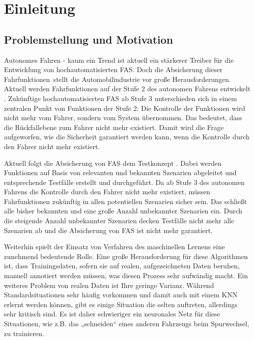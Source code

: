 
\chapter{Einleitung}
\label{einleitung}


\section{Problemstellung und Motivation}
\label{einleitung_problemstellung}

Autonomes Fahren - kaum ein Trend ist aktuell ein stärkerer Treiber für die Entwicklung von hochautomatisierten \ac{FAS}. Doch die Absicherung dieser Fahrfunktionen stellt die Automobilindustrie vor große Herausforderungen. Aktuell werden Fahrfunktionen auf der Stufe 2 des autonomen Fahrens entwickelt \cite{sae2014taxonomy}. Zukünftige hochautomatisierten \ac{FAS} ab Stufe 3 unterschieden sich in einem zentralen Punkt von Funktionen der Stufe 2: Die Kontrolle der Funktionen wird nicht mehr vom Fahrer, sondern vom System übernommen. Das bedeutet, dass die Rückfallebene zum Fahrer nicht mehr existiert. Damit wird die Frage aufgeworfen, wie die Sicherheit garantiert werden kann, wenn die Kontrolle durch den Fahrer nicht mehr existiert.

Aktuell folgt die Absicherung von \ac{FAS} dem Testkonzept \cite{schuldt2013effiziente}. Dabei werden Funktionen auf Basis von relevanten und bekannten Szenarien abgeleitet und entsprechende Testfälle erstellt und durchgeführt. Da ab Stufe 3 des autonomen Fahrens die Kontrolle durch den Fahrer nicht mehr existiert, müssen Fahrfunktionen zukünftig in allen potentiellen Szenarien sicher sein. Das schließt alle bisher bekannten und eine große Anzahl unbekannter Szenarien ein. Durch die steigende Anzahl unbekannter Szenarien decken Testfälle nicht mehr alle Szenarien ab und die Absicherung von \ac{FAS} ist nicht mehr garantiert.

Weiterhin spielt der Einsatz von Verfahren des maschinellen Lernens eine zunehmend bedeutende Rolle. Eine große Herausforderung für diese Algorithmen ist, dass Trainingsdaten, sofern sie auf realen, aufgezeichneten Daten beruhen, manuell annotiert werden müssen, was diesen Prozess sehr aufwändig macht. Ein weiteres Problem von realen Daten ist Ihre geringe Varianz. Während Standardsituationen sehr häufig vorkommen und damit auch mit einem \ac{KNN} erlernt werden können, gibt es einige Situation die selten auftreten, allerdings sehr kritisch sind. Es ist daher schwieriger ein neuronales Netz für diese Situationen, wie z.B. das „schneiden“ eines anderen Fahrzeugs beim Spurwechsel, zu trainieren.

